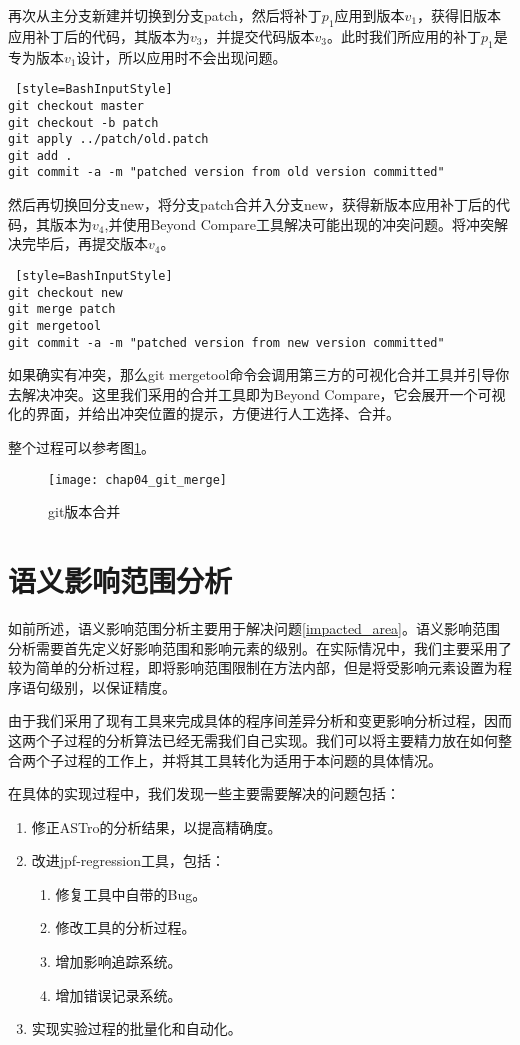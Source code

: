 再次从主分支新建并切换到分支patch，然后将补丁$p_1$应用到版本$v_1$，获得旧版本应用补丁后的代码，其版本为$v_3$，并提交代码版本$v_3$。此时我们所应用的补丁$p_1$是专为版本$v_1$设计，所以应用时不会出现问题。

\begin{lstlisting} [style=BashInputStyle]
git checkout master
git checkout -b patch
git apply ../patch/old.patch
git add .
git commit -a -m "patched version from old version committed"
\end{lstlisting}

然后再切换回分支new，将分支patch合并入分支new，获得新版本应用补丁后的代码，其版本为$v_4$,并使用Beyond Compare工具解决可能出现的冲突问题。将冲突解决完毕后，再提交版本$v_4$。

\begin{lstlisting} [style=BashInputStyle]
git checkout new
git merge patch
git mergetool
git commit -a -m "patched version from new version committed"
\end{lstlisting}

如果确实有冲突，那么git mergetool命令会调用第三方的可视化合并工具并引导你去解决冲突。这里我们采用的合并工具即为Beyond Compare，它会展开一个可视化的界面，并给出冲突位置的提示，方便进行人工选择、合并。

整个过程可以参考图\ref {git_merge}。

\begin{figure}[H]
	\centering
	\texttt{[image: chap04\_git\_merge]}
	\caption {git版本合并}
	\label {git_merge}	
\end{figure}

\section{语义影响范围分析}

如前所述，语义影响范围分析主要用于解决问题\ref {impacted_area}。语义影响范围分析需要首先定义好影响范围和影响元素的级别。在实际情况中，我们主要采用了较为简单的分析过程，即将影响范围限制在方法内部，但是将受影响元素设置为程序语句级别，以保证精度。

由于我们采用了现有工具来完成具体的程序间差异分析和变更影响分析过程，因而这两个子过程的分析算法已经无需我们自己实现。我们可以将主要精力放在如何整合两个子过程的工作上，并将其工具转化为适用于本问题的具体情况。

在具体的实现过程中，我们发现一些主要需要解决的问题包括：
\begin{enumerate}
	\item 修正ASTro的分析结果，以提高精确度。
	\item 改进jpf-regression工具，包括：
		\begin{enumerate}
			\item 修复工具中自带的Bug。
			\item 修改工具的分析过程。
			\item 增加影响追踪系统。
			\item 增加错误记录系统。
		\end{enumerate}
	
	\item 实现实验过程的批量化和自动化。
\end{enumerate}

